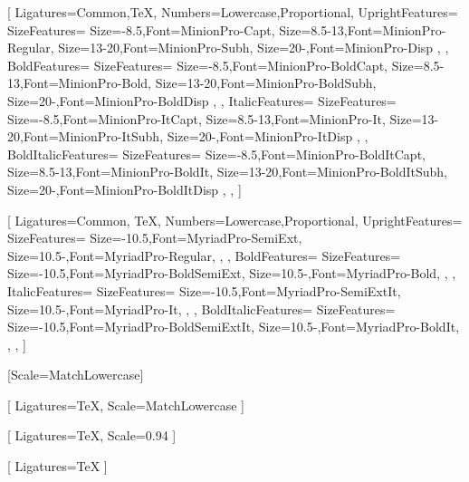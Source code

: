 %



\setmainfont{Minion Pro}[
    Ligatures={Common,TeX},
    Numbers={Lowercase,Proportional},
    UprightFeatures={
        SizeFeatures={ 
            {Size={-8.5},Font=MinionPro-Capt},
            {Size={8.5-13},Font=MinionPro-Regular},
            {Size={13-20},Font=MinionPro-Subh},
            {Size={20-},Font=MinionPro-Disp}
        },
    },
    BoldFeatures={
        SizeFeatures={ 
            {Size={-8.5},Font=MinionPro-BoldCapt},
            {Size={8.5-13},Font=MinionPro-Bold},
            {Size={13-20},Font=MinionPro-BoldSubh},
            {Size={20-},Font=MinionPro-BoldDisp}
        },
    },
    ItalicFeatures={
        SizeFeatures={ 
            {Size={-8.5},Font=MinionPro-ItCapt},
            {Size={8.5-13},Font=MinionPro-It},
            {Size={13-20},Font=MinionPro-ItSubh},
            {Size={20-},Font=MinionPro-ItDisp}
            },
    },
    BoldItalicFeatures={
        SizeFeatures={ 
            {Size={-8.5},Font=MinionPro-BoldItCapt},
            {Size={8.5-13},Font=MinionPro-BoldIt},
            {Size={13-20},Font=MinionPro-BoldItSubh},
            {Size={20-},Font=MinionPro-BoldItDisp}
        },
    },
]

\setsansfont{Myriad Pro}[
    Ligatures={Common, TeX},
    Numbers={Lowercase,Proportional},
    UprightFeatures={
        SizeFeatures={ 
            {Size={-10.5},Font=MyriadPro-SemiExt},
            {Size={10.5-},Font=MyriadPro-Regular},
        },
    },
    BoldFeatures={
        SizeFeatures={ 
            {Size={-10.5},Font=MyriadPro-BoldSemiExt},
            {Size={10.5-},Font=MyriadPro-Bold},
        },
    },
    ItalicFeatures={
        SizeFeatures={ 
            {Size={-10.5},Font=MyriadPro-SemiExtIt},
            {Size={10.5-},Font=MyriadPro-It},
        },
    },
    BoldItalicFeatures={
        SizeFeatures={ 
            {Size={-10.5},Font=MyriadPro-BoldSemiExtIt},
            {Size={10.5-},Font=MyriadPro-BoldIt},
        },
    },
]

\setmonofont{Iosevka}[Scale=MatchLowercase]

[
    Ligatures=TeX,
    Scale=MatchLowercase
]

\setmathfontface{}[
    Ligatures=TeX,
    Scale=0.94
]

\setoperatorfont\mathoper

\newfontface{}[
    Ligatures=TeX
]
